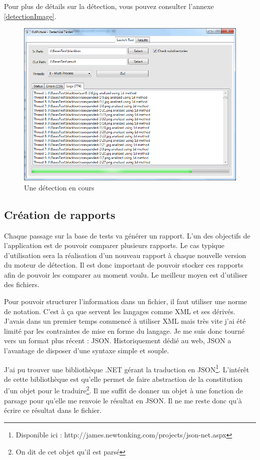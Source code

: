 Pour plus de détails sur la détection, vous pouvez consulter l'annexe \ref{detectionImage}.

\begin{figure}
\begin{center}
\includegraphics[scale=0.5]{images/projet1DetectionWindow.png}
\end{center}
\caption{Une détection en cours}
\end{figure}

\subsection{Création de rapports}

Chaque passage sur la base de tests va générer un rapport. L'un des objectifs de l'application est de pouvoir comparer plusieurs rapports. Le cas typique d'utilisation sera la réalisation d'un nouveau rapport à chaque nouvelle version du moteur de détection. Il est donc important de pouvoir stocker ces rapports afin de pouvoir les comparer au moment voulu. Le meilleur moyen est d'utiliser des fichiers.

Pour pouvoir structurer l'information dans un fichier, il faut utiliser une norme de notation. C'est à ça que servent les langages comme XML et ses dérivés. J'avais dans un premier temps commencé à utiliser XML mais très vite j'ai été limité par les contraintes de mise en forme du langage. Je me suis donc tourné vers un format plus récent : JSON. Historiquement dédié au web, JSON a l'avantage de disposer d'une syntaxe simple et souple.

J'ai pu trouver une bibliothèque .NET gérant la traduction en JSON\footnote{Disponible ici : http://james.newtonking.com/projects/json-net.aspx}. L'intérêt de cette bibliothèque est qu'elle permet de faire abstraction de la constitution d'un objet pour le traduire\footnote{On dit de cet objet qu'il est \og parsé \fg{} }. Il me suffit de donner un objet à une fonction de parsage pour qu'elle me renvoie le résultat en JSON. Il ne me reste donc qu'à écrire ce résultat dans le fichier.

